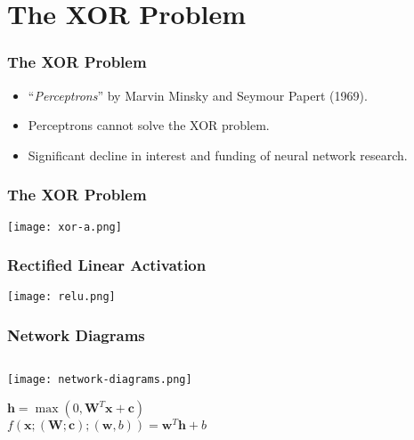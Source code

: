 

\subtitle{The XOR Problem}



\frame{\titlepage}

\section{The XOR Problem}


\begin{frame}
\frametitle{The XOR Problem}
\begin{itemize}
\item ``\textit{Perceptrons}'' by Marvin Minsky and Seymour Papert (1969).
\item Perceptrons cannot solve the XOR problem.
\item Significant decline in interest and funding of neural network research.
\end{itemize}
\end{frame}


\begin{frame}
\frametitle{The XOR Problem}
\begin{center}
\texttt{[image: xor-a.png]}
\end{center}
\end{frame}



\begin{frame}
\frametitle{Rectified Linear Activation}
\begin{center}
\texttt{[image: relu.png]}
\end{center}
\end{frame}




\begin{frame}
\frametitle{Network Diagrams}
\begin{columns}
\begin{column}{.4\textwidth}
\centering
\begin{center}
\texttt{[image: network-diagrams.png]}
\end{center}
$
\textbf{h} = \max(0, \textbf{W}^{T}\textbf{x} + \textbf{c})
$\\
$
f(\textbf{x}; (\textbf{W}; \textbf{c}); (\textbf{w}, b)) = \textbf{w}^{T} \textbf{h} + b
$
\end{column}
\begin{column}{.6\textwidth}
\end{column}
\end{columns}
\end{frame}


